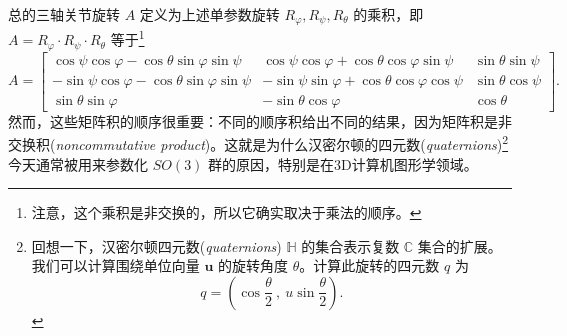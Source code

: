 \documentclass[11pt,fontset=founder]{ctexart}
\begin{document}
总的三轴关节旋转 $A$ 定义为上述单参数旋转 $R_{\varphi },R_{\psi },R_{\theta }$ 的乘积，即 $A=R_{\varphi }\cdot R_{\psi }\cdot R_{\theta }$ 等于\footnote{%
注意，这个乘积是非交换的，所以它确实取决于乘法的顺序。} 
\begin{equation*}
A=\left[
\begin{array}{ccc}
\cos \psi \cos \varphi -\cos \theta \sin \varphi \sin \psi & \cos \psi \cos
\varphi +\cos \theta \cos \varphi \sin \psi & \sin \theta \sin \psi \\
-\sin \psi \cos \varphi -\cos \theta \sin \varphi \sin \psi & -\sin \psi
\sin \varphi +\cos \theta \cos \varphi \cos \psi & \sin \theta \cos \psi \\
\sin \theta \sin \varphi & -\sin \theta \cos \varphi & \cos \theta%
\end{array}
\right] .
\end{equation*}
然而，这些矩阵积的顺序很重要：不同的顺序积给出不同的结果，因为矩阵积是非交换积(\textit{noncommutative product})。这就是为什么汉密尔顿的四元数(\textit{quaternions})\footnote{%
回想一下，汉密尔顿四元数(\textit{quaternions}) $\mathbb{H}$ 的集合表示复数 $\mathbb{C}$ 集合的扩展。我们可以计算围绕单位向量 $\mathbf{u}$ 的旋转角度 $\theta $。计算此旋转的四元数 $q$ 为
\begin{equation*}
q=\left( \cos \frac{\theta }{2}~,~u\sin \frac{\theta }{2}\right) .
\end{equation*}%
}今天通常被用来参数化 $SO(3)$ 群的原因，特别是在3D计算机图形学领域。
\end{document}

